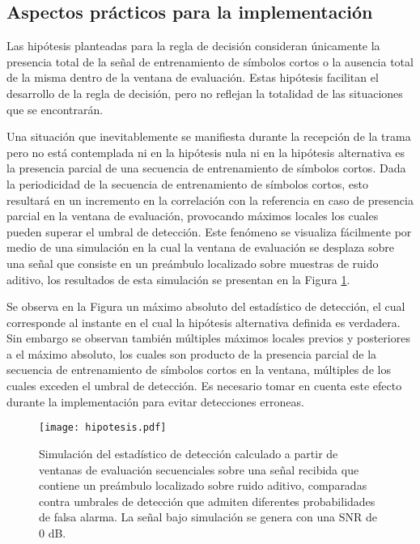 \color{RoyalBlue}
\subsection{Aspectos prácticos para la implementación}

Las hipótesis planteadas para la regla de decisión consideran únicamente la presencia total de la señal de entrenamiento de símbolos cortos o la ausencia total de la misma dentro de la ventana de evaluación. Estas hipótesis facilitan el desarrollo de la regla de decisión, pero no reflejan la totalidad de las situaciones que se encontrarán. 

Una situación que inevitablemente se manifiesta durante la recepción de la trama pero no está contemplada ni en la hipótesis nula ni en la hipótesis alternativa es la presencia parcial de una secuencia de entrenamiento de símbolos cortos. Dada la periodicidad de la secuencia de entrenamiento de símbolos cortos, esto resultará en un incremento en la correlación con la referencia en caso de presencia parcial en la ventana de evaluación, provocando máximos locales los cuales pueden superar el umbral de detección. Este fenómeno se visualiza fácilmente por medio de una simulación en la cual la ventana de evaluación se desplaza sobre una señal que consiste en un preámbulo localizado sobre muestras de ruido aditivo, los resultados de esta simulación se presentan en la Figura \ref{fig:hipotesis-notas}.

Se observa en la Figura un máximo absoluto del estadístico de detección, el cual corresponde al instante en el cual la hipótesis alternativa definida es verdadera. Sin embargo se observan también múltiples máximos locales previos y posteriores a el máximo absoluto, los cuales son producto de la presencia parcial de la secuencia de entrenamiento de símbolos cortos en la ventana, múltiples de los cuales exceden el umbral de detección. Es necesario tomar en cuenta este efecto durante la implementación para evitar detecciones erroneas.

\begin{figure}[t]
    \centering{}\texttt{[image: hipotesis.pdf]}
    \caption[Simulación del estadístico de detección aplicado a una señal recibida que contiene un preámbulo localizado sobre ruido aditivo.]{Simulación del estadístico de detección calculado a partir de ventanas de evaluación secuenciales sobre una señal recibida que contiene un preámbulo localizado sobre ruido aditivo, comparadas contra umbrales de detección que admiten diferentes probabilidades de falsa alarma. La señal bajo simulación se genera con una SNR de 0 dB.\label{fig:hipotesis-notas}}
\end{figure}

